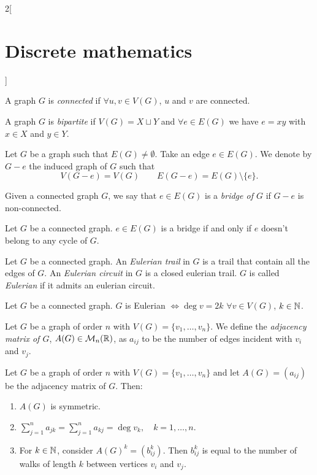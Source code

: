 \documentclass[../../../main.tex]{subfiles}
\begin{document}
\begin{multicols}{2}[\section{Discrete mathematics}]
\begin{prop}
\end{prop}
\begin{definition}
A graph $G$ is \textit{connected} if $\forall u,v\in V(G)$, $u$ and $v$ are connected.
\end{definition}
\begin{definition}
A graph $G$ is \textit{bipartite} if $V(G)=X\sqcup Y$ and $\forall e\in E(G)$ we have $e=xy$ with $x\in X$ and $y\in Y$.
\end{definition}
\begin{definition}
Let $G$ be a graph such that $E(G)\ne\emptyset$. Take an edge $e\in E(G)$. We denote by $G-e$ the induced graph of $G$ such that $$V(G-e)=V(G)\qquad E(G-e)=E(G)\setminus\{e\}.$$
\end{definition}
\begin{definition}
Given a connected graph $G$, we say that $e\in E(G)$ is a \textit{bridge of $G$} if $G-e$ is non-connected.
\end{definition}
\begin{prop}
Let $G$ be a connected graph. $e\in E(G)$ is a bridge if and only if $e$ doesn't belong to any cycle of $G$.
\end{prop}
\begin{definition}
Let $G$ be a connected graph. An \textit{Eulerian trail} in $G$ is a trail that contain all the edges of $G$. An \textit{Eulerian circuit} in $G$ is a closed eulerian trail. $G$ is called \textit{Eulerian} if it admits an eulerian circuit.
\end{definition}
\begin{theorem}
Let $G$ be a connected graph. $G$ is Eulerian $\iff\deg v=2k$ $\forall v\in V(G)$, $k\in\mathbb{N} $.
\end{theorem}
\begin{definition}
Let $G$ be a graph of order $n$ with $V(G)=\{v_1,\ldots,v_n\}$. We define the \textit{adjacency matrix of $G$}, $A(G)\in\mathcal{M}_n(\mathbb{R} )$, as $a_{ij}$ to be the number of edges incident with $v_i$ and $v_j$.
\end{definition}
\begin{prop}
Let $G$ be a graph of order $n$ with $V(G)=\{v_1,\ldots,v_n\}$ and let $A(G)=(a_{ij})$ be the adjacency matrix of $G$. Then:
\begin{enumerate}
    \item $A(G)$ is symmetric.
    \item $\displaystyle\sum_{j=1}^n a_{jk}=\sum_{j=1}^n a_{kj}=\deg v_k,\quad k=1,\ldots,n$.
    \item For $k\in\mathbb{N} $, consider $A(G)^k=(b_{ij}^k)$. Then $b_{ij}^k$ is equal to the number of walks of length $k$ between vertices $v_i$ and $v_j$.

\end{enumerate}
\end{prop}
\end{multicols}
\end{document}
